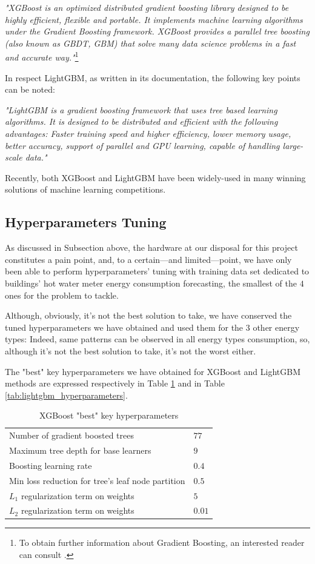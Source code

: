 \documentclass[twocolumn, switch]{article}
\begin{document}
\textit{"XGBoost is an optimized distributed gradient boosting library designed to be highly efficient, flexible and portable. It implements machine learning algorithms under the Gradient Boosting framework. XGBoost provides a parallel tree boosting (also known as GBDT, GBM) that solve many data science problems in a fast and accurate way."}\footnote{To obtain further information about Gradient Boosting, an interested reader can consult \cite{Friedman_2001}.}

In respect LightGBM, as written in its documentation, the following key points can be noted:

\textit{"LightGBM is a gradient boosting framework that uses tree based learning algorithms. It is designed to be distributed and efficient with the following advantages: Faster training speed and higher efficiency, lower memory usage, better accuracy, support of parallel and GPU learning, capable of handling large-scale data."}

Recently, both XGBoost and LightGBM have been widely-used in many winning solutions of machine learning competitions.

\subsection{Hyperparameters Tuning}

As discussed in Subsection above, the hardware at our disposal for this project constitutes a pain point, and, to a certain---and limited---point, we have only been able to perform hyperparameters' tuning with training data set dedicated to buildings' hot water meter energy consumption forecasting, the smallest of the $4$ ones for the problem to tackle.

Although, obviously, it's not the best solution to take, we have conserved the tuned hyperparameters we have obtained and used them for the $3$ other energy types: Indeed, same patterns can be observed in all energy types consumption, so, although it's not the best solution to take, it's not the worst either.

The "best" key hyperparameters we have obtained for XGBoost and LightGBM methods are expressed respectively in Table \ref{tab:xgboost_hyperparameters} and in Table \ref{tab:lightgbm_hyperparameters}.

\begin{table}[H]
\caption{XGBoost "best" key hyperparameters}
\centering
\begin{tabular}{ll}
\toprule
Number of gradient boosted trees & $77$ \\
Maximum tree depth for base learners & $9$ \\
Boosting learning rate & $0.4$ \\
Min loss reduction for tree's leaf node partition & $0.5$ \\
$L_1$ regularization term on weights & $5$ \\
$L_2$ regularization term on weights & $0.01$ \\
\bottomrule
\end{tabular}
\label{tab:xgboost_hyperparameters}
\end{table}
\end{document}
